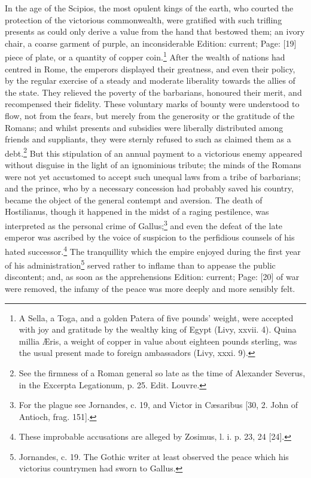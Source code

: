 In the age of the Scipios, the most opulent kings of the earth, who courted the protection of the victorious commonwealth, were gratified with such trifling presents as could only derive a value from the hand that bestowed them; an ivory chair, a coarse garment of purple, an inconsiderable Edition: current; Page: [19] piece of plate, or a quantity of copper coin.\footnote{A Sella, a Toga, and a golden Patera of five pounds\texthebrew{}’ weight, were accepted with joy and gratitude by the wealthy king of Egypt (Livy, xxvii. 4). Quina millia Æris, a weight of copper in value about eighteen pounds sterling, was the usual present made to foreign ambassadors (Livy, xxxi. 9).} After the wealth of nations had centred in Rome, the emperors displayed their greatness, and even their policy, by the regular exercise of a steady and moderate liberality towards the allies of the state. They relieved the poverty of the barbarians, honoured their merit, and recompensed their fidelity. These voluntary marks of bounty were understood to flow, not from the fears, but merely from the generosity or the gratitude of the Romans; and whilst presents and subsidies were liberally distributed among friends and suppliants, they were sternly refused to such as claimed them as a debt.\footnote{See the firmness of a Roman general so late as the time of Alexander Severus, in the Excerpta Legationum, p. 25. Edit. Louvre.} But this stipulation of an annual payment to a victorious enemy appeared without disguise in the light of an ignominious tribute; the minds of the Romans were not yet accustomed to accept such unequal laws from a tribe of barbarians; and the prince, who by a necessary concession had probably saved his country, became the object of the general contempt and aversion. The death of Hostilianus, though it happened in the midst of a raging pestilence, was interpreted as the personal crime of Gallus;\footnote{For the plague see Jornandes, c. 19, and Victor in Cæsaribus [30, 2. John of Antioch, frag. 151].} and even the defeat of the late emperor was ascribed by the voice of suspicion to the perfidious counsels of his hated successor.\footnote{These improbable accusations are alleged by Zosimus, l. i. p. 23, 24 [24].} The tranquillity which the empire enjoyed during the first year of his administration\footnote{Jornandes, c. 19. The Gothic writer at least observed the peace which his victorius countrymen had sworn to Gallus.} served rather to inflame than to appease the public discontent; and, as soon as the apprehensions Edition: current; Page: [20] of war were removed, the infamy of the peace was more deeply and more sensibly felt.

